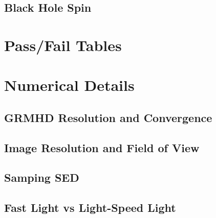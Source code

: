 \documentclass[twocolumn,twocolappendix,tighten,dvipsnames,linenumbers]{aastex63}
\begin{document}
\subsection{Black Hole Spin}

 \software{\ehtim, \difmap, \smili, \dmc, \themis,
  \foci}

\appendix

\section{Pass/Fail Tables}

\section{Numerical Details}

\subsection{GRMHD Resolution and Convergence}

\subsection{Image Resolution and Field of View}

\subsection{Samping SED}

\subsection{Fast Light vs Light-Speed Light}




\end{document}

